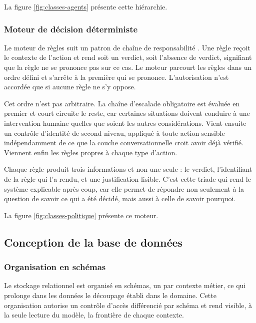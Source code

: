 La figure \ref{fig:classes-agents} présente cette hiérarchie.


\subsubsection{Moteur de décision déterministe}

Le moteur de règles suit un patron de chaîne de responsabilité \cite{gamma}. Une règle reçoit le contexte de l'action et rend soit un verdict, soit l'absence de verdict, signifiant que la règle ne se prononce pas sur ce cas. Le moteur parcourt les règles dans un ordre défini et s'arrête à la première qui se prononce. L'autorisation n'est accordée que si aucune règle ne s'y oppose.

Cet ordre n'est pas arbitraire. La chaîne d'escalade obligatoire est évaluée en premier et court circuite le reste, car certaines situations doivent conduire à une intervention humaine quelles que soient les autres considérations. Vient ensuite un contrôle d'identité de second niveau, appliqué à toute action sensible indépendamment de ce que la couche conversationnelle croit avoir déjà vérifié. Viennent enfin les règles propres à chaque type d'action.

Chaque règle produit trois informations et non une seule : le verdict, l'identifiant de la règle qui l'a rendu, et une justification lisible. C'est cette triade qui rend le système explicable après coup, car elle permet de répondre non seulement à la question de savoir ce qui a été décidé, mais aussi à celle de savoir pourquoi.

La figure \ref{fig:classes-politique} présente ce moteur.


\subsection{Conception de la base de données}

\subsubsection{Organisation en schémas}

Le stockage relationnel est organisé en schémas, un par contexte métier, ce qui prolonge dans les données le découpage établi dans le domaine. Cette organisation autorise un contrôle d'accès différencié par schéma et rend visible, à la seule lecture du modèle, la frontière de chaque contexte.

